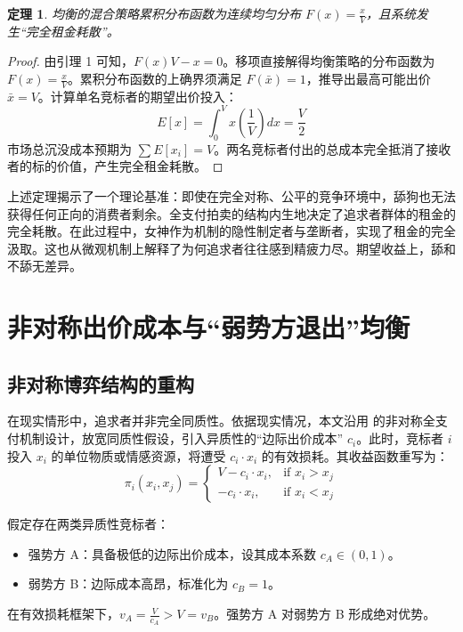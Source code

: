 \documentclass[11pt, a4paper, UTF8]{chinese-erj}
\newtheorem{theorem}{定理}
\begin{document}
\begin{theorem}
均衡的混合策略累积分布函数为连续均匀分布 $F(x) = \frac{x}{V}$，且系统发生“完全租金耗散”。
\end{theorem}

\begin{proof}
由引理 1 可知，$F(x)V - x = 0$。移项直接解得均衡策略的分布函数为 $F(x) = \frac{x}{V}$。累积分布函数的上确界须满足 $F(\bar{x}) = 1$，推导出最高可能出价 $\bar{x} = V$。计算单名竞标者的期望出价投入：
$$E[x] = \int_{0}^{V} x \left(\frac{1}{V}\right) dx = \frac{V}{2}$$
市场总沉没成本预期为 $\sum E[x_i] = V$。两名竞标者付出的总成本完全抵消了接收者的标的价值，产生完全租金耗散。
\end{proof}

上述定理揭示了一个理论基准：即使在完全对称、公平的竞争环境中，舔狗也无法获得任何正向的消费者剩余。全支付拍卖的结构内生地决定了追求者群体的租金的完全耗散。在此过程中，女神作为机制的隐性制定者与垄断者，实现了租金的完全汲取。这也从微观机制上解释了为何追求者往往感到精疲力尽。期望收益上，舔和不舔无差异。

\section{非对称出价成本与“弱势方退出”均衡}

\subsection{非对称博弈结构的重构}
在现实情形中，追求者并非完全同质性。依据现实情况，本文沿用 \textcite{HillmanRiley1989} 的非对称全支付机制设计，放宽同质性假设，引入异质性的“边际出价成本” $c_i$。此时，竞标者 $i$ 投入 $x_i$ 的单位物质或情感资源，将遭受 $c_i \cdot x_i$ 的有效损耗。其收益函数重写为：
\begin{equation}
\pi_i(x_i, x_j) = 
\begin{cases} 
V - c_i \cdot x_i, & \text{if } x_i > x_j \\
- c_i \cdot x_i, & \text{if } x_i < x_j
\end{cases}
\end{equation}

假定存在两类异质性竞标者：
\begin{itemize}
    \item 强势方 A：具备极低的边际出价成本，设其成本系数 $c_A \in (0, 1)$。
    \item 弱势方 B：边际成本高昂，标准化为 $c_B = 1$。
\end{itemize}
在有效损耗框架下，$v_A = \frac{V}{c_A} > V = v_B$。强势方 A 对弱势方 B 形成绝对优势。
\end{document}
